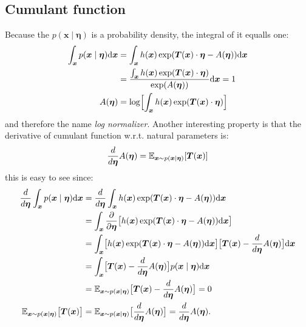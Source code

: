 \subsection*{Cumulant function}
Because the $p(\boldsymbol{x}\mid \boldsymbol{\eta})$ is a probability density, the integral of it equalls one:
\begin{align}
    \int_{\boldsymbol{x}} p(\boldsymbol{x}\mid \boldsymbol{\eta}) \mbox{\rm d}\boldsymbol{x} &= \int_{\boldsymbol{x}} h(\boldsymbol{x}) \exp( \boldsymbol{T}(\boldsymbol{x}) \cdot \boldsymbol{\eta} - A(\boldsymbol{\eta})) \mbox{\rm d}\boldsymbol{x} \notag  \\
    &=  \frac{ \int_{\boldsymbol{x}}  h(\boldsymbol{x})\exp( \boldsymbol{T}(\boldsymbol{x}) \cdot \boldsymbol{\eta})}{\exp(A(\boldsymbol{\eta}))}  \mbox{\rm d}\boldsymbol{x} = 1  \notag\\
    A(\boldsymbol{\eta}) &= \log\Bigl[ \int_{\boldsymbol{x}} h(\boldsymbol{x})\exp( \boldsymbol{T}(\boldsymbol{x}) \cdot \boldsymbol{\eta})\Bigr] \label{eq:log_norm}
\end{align}
and therefore the name \textit{log normalizer}. Another interesting property is that the derivative of cumulant function w.r.t. natural parameters is:
$$
\frac{d}{d \boldsymbol{\eta}} A(\boldsymbol{\eta}) = \operatorname{\mathbb{E}}_{\boldsymbol{x} \sim p(\boldsymbol{x}\mid \boldsymbol{\eta})} [\boldsymbol{T}(\boldsymbol{x})]
$$
this is easy to see since:
\begin{align*}
    \frac{d}{d \boldsymbol{\eta}} \int_{\boldsymbol{x}} p(\boldsymbol{x}\mid \boldsymbol{\eta}) \mbox{\rm d}\boldsymbol{x}&= \frac{d}{d \boldsymbol{\eta}}   \int_{\boldsymbol{x}} h(\boldsymbol{x}) \exp( \boldsymbol{T}(\boldsymbol{x}) \cdot \boldsymbol{\eta} - A(\boldsymbol{\eta})) \mbox{\rm d}\boldsymbol{x} \\
    &=\int_{\boldsymbol{x}}  \frac{\partial}{\partial \boldsymbol{\eta}} \bigl[h(\boldsymbol{x}) \exp( \boldsymbol{T}(\boldsymbol{x}) \cdot \boldsymbol{\eta} - A(\boldsymbol{\eta})) \mbox{\rm d}\boldsymbol{x} \bigr]  \\
    &=\int_{\boldsymbol{x}}  \bigl[h(\boldsymbol{x}) \exp( \boldsymbol{T}(\boldsymbol{x}) \cdot \boldsymbol{\eta} - A(\boldsymbol{\eta})) \mbox{\rm d}\boldsymbol{x} \bigr] \bigl[ \boldsymbol{T}(\boldsymbol{x}) - \frac{d}{d\boldsymbol{\eta}} A(\boldsymbol{\eta}) \bigr]\mbox{\rm d}\boldsymbol{x} \\
    &=\int_{\boldsymbol{x}}  \bigl[\boldsymbol{T}(\boldsymbol{x}) - \frac{d}{d\boldsymbol{\eta}} A(\boldsymbol{\eta})\bigr] p(\boldsymbol{x}\mid \boldsymbol{\eta}) \mbox{\rm d}\boldsymbol{x}  \\
    &=\operatorname{\mathbb{E}}_{\boldsymbol{x} \sim p(\boldsymbol{x}\mid \boldsymbol{\eta})}\bigl[\boldsymbol{T}(\boldsymbol{x}) - \frac{d}{d\boldsymbol{\eta}} A(\boldsymbol{\eta}) \bigr] = 0 \\
    \operatorname{\mathbb{E}}_{\boldsymbol{x} \sim p(\boldsymbol{x}\mid \boldsymbol{\eta})}\bigl[\boldsymbol{T}(\boldsymbol{x})\bigr] &= \operatorname{\mathbb{E}}_{\boldsymbol{x} \sim p(\boldsymbol{x}\mid \boldsymbol{\eta})} \bigl[\frac{d}{d\boldsymbol{\eta}} A(\boldsymbol{\eta}) \bigr] = \frac{d}{d\boldsymbol{\eta}} A(\boldsymbol{\eta}).
\end{align*}

